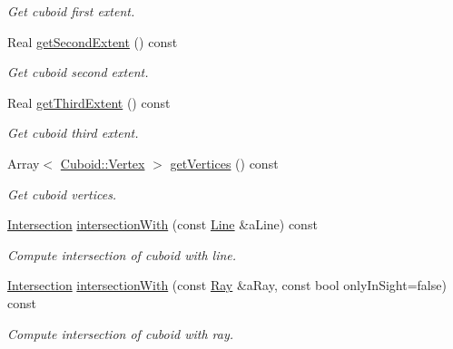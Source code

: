 \begin{DoxyCompactItemize}
\begin{DoxyCompactList}\small\item\em Get cuboid first extent. \end{DoxyCompactList}\item 
Real \hyperlink{classlibrary_1_1math_1_1geom_1_1d3_1_1objects_1_1_cuboid_a252d7954c3a1bf3edda6db0f4098b226}{get\+Second\+Extent} () const
\begin{DoxyCompactList}\small\item\em Get cuboid second extent. \end{DoxyCompactList}\item 
Real \hyperlink{classlibrary_1_1math_1_1geom_1_1d3_1_1objects_1_1_cuboid_a1b1541558cfac6d90e0fd4d3c4dd7d96}{get\+Third\+Extent} () const
\begin{DoxyCompactList}\small\item\em Get cuboid third extent. \end{DoxyCompactList}\item 
Array$<$ \hyperlink{classlibrary_1_1math_1_1geom_1_1d3_1_1objects_1_1_cuboid_ad9600791c8ac7f1253dc94417ec12f3c}{Cuboid\+::\+Vertex} $>$ \hyperlink{classlibrary_1_1math_1_1geom_1_1d3_1_1objects_1_1_cuboid_adba483e8727feeaa99c3e4135831ce86}{get\+Vertices} () const
\begin{DoxyCompactList}\small\item\em Get cuboid vertices. \end{DoxyCompactList}\item 
\hyperlink{classlibrary_1_1math_1_1geom_1_1d3_1_1_intersection}{Intersection} \hyperlink{classlibrary_1_1math_1_1geom_1_1d3_1_1objects_1_1_cuboid_a1f347ffdf70cb64bdbf236abd089715c}{intersection\+With} (const \hyperlink{classlibrary_1_1math_1_1geom_1_1d3_1_1objects_1_1_line}{Line} \&a\+Line) const
\begin{DoxyCompactList}\small\item\em Compute intersection of cuboid with line. \end{DoxyCompactList}\item 
\hyperlink{classlibrary_1_1math_1_1geom_1_1d3_1_1_intersection}{Intersection} \hyperlink{classlibrary_1_1math_1_1geom_1_1d3_1_1objects_1_1_cuboid_aa503c32d68da8de1f45eefd77cbd6a24}{intersection\+With} (const \hyperlink{classlibrary_1_1math_1_1geom_1_1d3_1_1objects_1_1_ray}{Ray} \&a\+Ray, const bool only\+In\+Sight=false) const
\begin{DoxyCompactList}\small\item\em Compute intersection of cuboid with ray. \end{DoxyCompactList}\item 

\end{DoxyCompactItemize}

